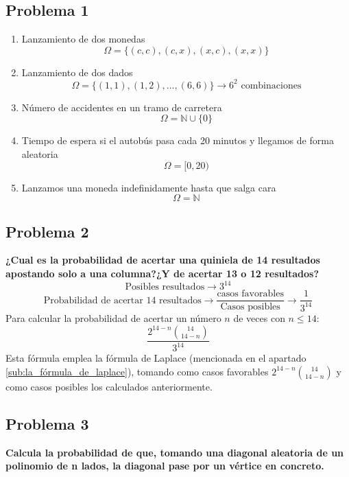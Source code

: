 \documentclass[11pt]{article}
\newcommand{\N}{\mathbb{N}}
\newcommand{\OMG}{\varOmega}
\theoremstyle{plain}
\begin{document}
        \subsection{Problema 1} %
        \label{sub:problema_1}
            \begin{enumerate}[label=\Alph*]
                \item Lanzamiento de dos monedas \[\OMG = \{(c,c),(c,x),(x,c),(x,x)\}\]
                \item Lanzamiento de dos dados \[\OMG = \{(1,1),(1,2),...,(6,6)\} \rightarrow 6^2 \text{ combinaciones}\]
                \item Número de accidentes en un tramo de carretera \[\OMG = \N \cup \{0\}\]
                \item Tiempo de espera si el autobús pasa cada 20 minutos y llegamos de forma aleatoria \[\OMG = [0,20)\]
                \item Lanzamos una moneda indefinidamente hasta que salga cara \[\OMG = \N\] 
            \end{enumerate}        
        \subsection{Problema 2} %
        \label{sub:problema_2}
            \textbf{¿Cual es la probabilidad de acertar una quiniela de 14 resultados apostando solo a una columna?¿Y de acertar 13 o 12 resultados?}
            \[\text{Posibles resultados}\rightarrow3^{14}\]
            \[\text{Probabilidad de acertar 14 resultados} \rightarrow \frac{\text{casos favorables}}{\text{Casos posibles}} \rightarrow \frac{1}{3^{14}}\]
            Para calcular la probabilidad de acertar un número $n$ de veces con $n\le14$:
            \begin{equation}
                \frac{2^{14-n} \binom{14}{14-{}n}}{3^{14}}
            \end{equation}
            Esta fórmula emplea la fórmula de Laplace (mencionada en el apartado \ref{sub:la_fórmula_de_laplace}), tomando como casos favorables $2^{14-n} \binom{14}{14-n}$ y como casos posibles los calculados anteriormente.
        \subsection{Problema 3} %
        \label{sub:problema_3}
            \textbf{Calcula la probabilidad de que, tomando una diagonal aleatoria de un polinomio de n lados, la diagonal pase por un vértice en concreto.}\\
\end{document}
